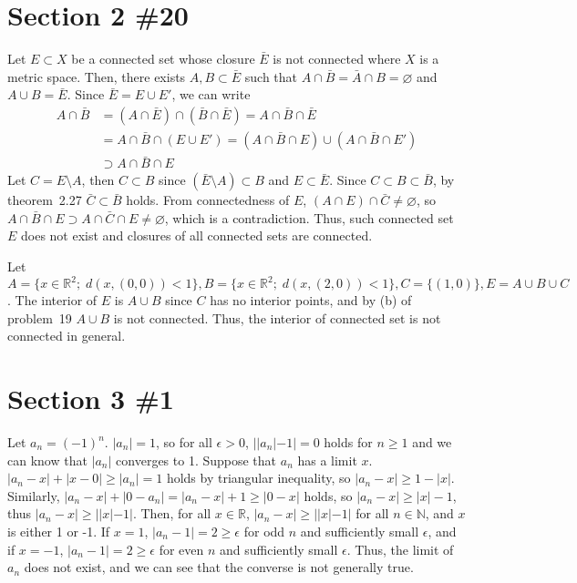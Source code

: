 \documentclass{scrartcl}
\begin{document}
\section{Section 2 \#20}
Let \(E \subset X\) be a connected set whose closure \(\bar{E}\) is not connected where \(X\) is a metric space.
Then, there exists \(A, B \subset \bar{E}\) such that \(A \cap \bar{B} = \bar{A} \cap B = \varnothing\) and \(A \cup B = \bar{E}\).
Since \(\bar{E} = E \cup E'\), we can write
\begin{align*}
  A \cap \bar{B} &= (A \cap \bar{E}) \cap (\bar{B} \cap \bar{E}) = A \cap \bar{B} \cap \bar{E} \\
                 &= A \cap \bar{B} \cap (E \cup E') = (A \cap \bar{B} \cap E) \cup (A \cap \bar{B} \cap E') \\
                 &\supset A \cap \bar{B} \cap E
\end{align*}
Let \(C = E \setminus A\), then \(C \subset B\) since \((\bar{E} \setminus A) \subset B\) and \(E \subset \bar{E}\).
Since \(C \subset B \subset \bar{B}\), by theorem~2.27 \(\bar{C} \subset \bar{B}\) holds.
From connectedness of \(E\), \((A \cap E) \cap \bar{C} \not = \varnothing\), so \(A \cap \bar{B} \cap E \supset A \cap \bar{C} \cap E \not = \varnothing\), which is a contradiction.
Thus, such connected set \(E\) does not exist and closures of all connected sets are connected.

Let \(A = \{x \in \mathbb{R}^2;\; d(x, (0, 0)) < 1\}, B = \{x \in \mathbb{R}^2;\; d(x, (2, 0)) < 1\}, C = \{(1, 0)\}, E = A \cup B \cup C\).
The interior of \(E\) is \(A \cup B\) since \(C\) has no interior points, and by (b) of problem~19 \(A \cup B\) is not connected.
Thus, the interior of connected set is not connected in general.

\section{Section 3 \#1}
Let \(a_n = (-1)^n\).
\(|a_n| = 1\), so for all \(\epsilon > 0\), \(||a_n| - 1| = 0\) holds for \(n \geq 1\) and we can know that \(|a_n|\) converges to 1.
Suppose that \(a_n\) has a limit \(x\).
\(|a_n - x| + |x - 0| \geq |a_n| = 1\) holds by triangular inequality, so \(|a_n - x| \geq 1 - |x|\).
Similarly, \(|a_n - x| + |0 - a_n| = |a_n - x| + 1 \geq |0 - x|\) holds, so \(|a_n - x| \geq |x| - 1\), thus \(|a_n - x| \geq ||x| - 1|\).
Then, for all \(x \in \mathbb{R}\), \(|a_n - x| \geq ||x| - 1|\) for all \(n \in \mathbb{N}\), and \(x\) is either 1 or -1.
If \(x = 1\), \(|a_n - 1| = 2 \geq \epsilon\) for odd \(n\) and sufficiently small \(\epsilon\), and if \(x = -1\), \(|a_n - 1| = 2 \geq \epsilon\) for even \(n\) and sufficiently small \(\epsilon\).
Thus, the limit of \(a_n\) does not exist, and we can see that the converse is not generally true.
\end{document}
